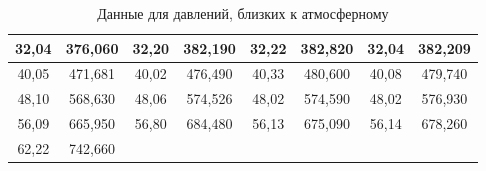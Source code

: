 \documentclass[a4paper,12pt]{article}
\begin{document}
\begin{table}[H]
\begin{tabular}{|cc|cc|cc|cc|}
        \multicolumn{1}{|c|}{{\color[HTML]{000000} 32,04}} &
          {\color[HTML]{000000} 376,060} &
          \multicolumn{1}{c|}{{\color[HTML]{000000} 32,20}} &
          {\color[HTML]{000000} 382,190} &
          \multicolumn{1}{c|}{{\color[HTML]{000000} 32,22}} &
          {\color[HTML]{000000} 382,820} &
          \multicolumn{1}{c|}{{\color[HTML]{000000} 32,04}} &
          {\color[HTML]{000000} 382,209} \\ \hline
        \multicolumn{1}{|c|}{{\color[HTML]{000000} 40,05}} &
          {\color[HTML]{000000} 471,681} &
          \multicolumn{1}{c|}{{\color[HTML]{000000} 40,02}} &
          {\color[HTML]{000000} 476,490} &
          \multicolumn{1}{c|}{{\color[HTML]{000000} 40,33}} &
          {\color[HTML]{000000} 480,600} &
          \multicolumn{1}{c|}{{\color[HTML]{000000} 40,08}} &
          {\color[HTML]{000000} 479,740} \\ \hline
        \multicolumn{1}{|c|}{{\color[HTML]{000000} 48,10}} &
          {\color[HTML]{000000} 568,630} &
          \multicolumn{1}{c|}{{\color[HTML]{000000} 48,06}} &
          {\color[HTML]{000000} 574,526} &
          \multicolumn{1}{c|}{{\color[HTML]{000000} 48,02}} &
          {\color[HTML]{000000} 574,590} &
          \multicolumn{1}{c|}{{\color[HTML]{000000} 48,02}} &
          {\color[HTML]{000000} 576,930} \\ \hline
        \multicolumn{1}{|c|}{{\color[HTML]{000000} 56,09}} &
          {\color[HTML]{000000} 665,950} &
          \multicolumn{1}{c|}{{\color[HTML]{000000} 56,80}} &
          {\color[HTML]{000000} 684,480} &
          \multicolumn{1}{c|}{{\color[HTML]{000000} 56,13}} &
          {\color[HTML]{000000} 675,090} &
          \multicolumn{1}{c|}{{\color[HTML]{000000} 56,14}} &
          {\color[HTML]{000000} 678,260} \\ \hline
        \multicolumn{1}{|c|}{{\color[HTML]{000000} 62,22}} &
          {\color[HTML]{000000} 742,660} &
          \multicolumn{1}{c|}{{\color[HTML]{000000} }} &
          {\color[HTML]{000000} } &
          \multicolumn{1}{c|}{{\color[HTML]{000000} }} &
          {\color[HTML]{000000} } &
          \multicolumn{1}{c|}{{\color[HTML]{000000} }} &
          {\color[HTML]{000000} } \\ \hline
    \end{tabular}
    \caption*{Данные для давлений, близких к атмосферному}
\end{table}
\end{document}
